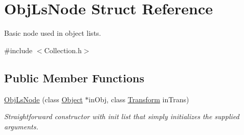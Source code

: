 \hypertarget{struct_obj_ls_node}{}\section{Obj\+Ls\+Node Struct Reference}
\label{struct_obj_ls_node}


Basic node used in object lists.  




{\ttfamily \#include $<$Collection.\+h$>$}

\subsection*{Public Member Functions}
\begin{DoxyCompactItemize}
\item 
\hypertarget{struct_obj_ls_node_ab363607829875f39aaaeb69c8e0f73b9}{}\label{struct_obj_ls_node_ab363607829875f39aaaeb69c8e0f73b9} 
\hyperlink{struct_obj_ls_node_ab363607829875f39aaaeb69c8e0f73b9}{Obj\+Ls\+Node} (class \hyperlink{class_object}{Object} $\ast$in\+Obj, class \hyperlink{class_transform}{Transform} in\+Trans)
\begin{DoxyCompactList}\small\item\em Straightforward constructor with init list that simply initializes the supplied arguments. \end{DoxyCompactList}\end{DoxyCompactItemize}
